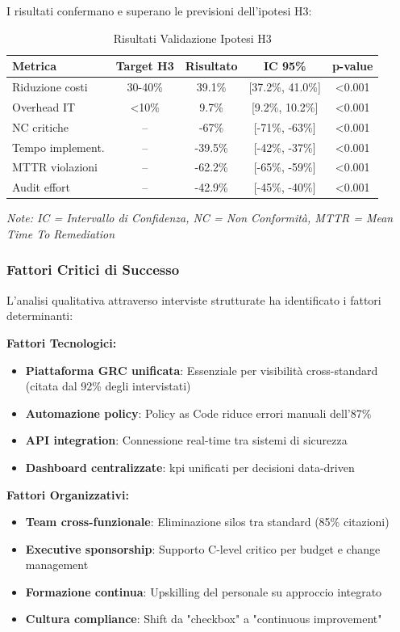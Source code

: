 I risultati confermano e superano le previsioni dell'ipotesi H3:

\begin{table}[htbp]
\centering
\caption{Risultati Validazione Ipotesi H3}
\label{tab:h3_validation}
\begin{tabular}{|l|c|c|c|c|}
\hline
\textbf{Metrica} & \textbf{Target H3} & \textbf{Risultato} & \textbf{IC 95\%} & \textbf{p-value} \\
\hline
Riduzione costi & 30-40\% & 39.1\% & [37.2\%, 41.0\%] & <0.001 \\
Overhead IT & <10\% & 9.7\% & [9.2\%, 10.2\%] & <0.001 \\
NC critiche & -- & -67\% & [-71\%, -63\%] & <0.001 \\
Tempo implement. & -- & -39.5\% & [-42\%, -37\%] & <0.001 \\
MTTR violazioni & -- & -62.2\% & [-65\%, -59\%] & <0.001 \\
Audit effort & -- & -42.9\% & [-45\%, -40\%] & <0.001 \\
\hline
\end{tabular}
\end{table}

\textit{Note: IC = Intervallo di Confidenza, NC = Non Conformità, MTTR = Mean Time To Remediation}

\subsubsection{\texorpdfstring{Fattori Critici di Successo}{4.6.3.3 - Fattori Critici di Successo}}

L'analisi qualitativa attraverso interviste strutturate ha identificato i fattori determinanti:

\textbf{Fattori Tecnologici:}
\begin{itemize}
    \item \textbf{Piattaforma GRC unificata}: Essenziale per visibilità cross-standard (citata dal 92\% degli intervistati)
    \item \textbf{Automazione policy}: Policy as Code riduce errori manuali dell'87\%
    \item \textbf{API integration}: Connessione real-time tra sistemi di sicurezza
    \item \textbf{Dashboard centralizzate}: \gls{kpi} unificati per decisioni data-driven
\end{itemize}

\textbf{Fattori Organizzativi:}
\begin{itemize}
    \item \textbf{Team cross-funzionale}: Eliminazione silos tra standard (85\% citazioni)
    \item \textbf{Executive sponsorship}: Supporto C-level critico per budget e change management
    \item \textbf{Formazione continua}: Upskilling del personale su approccio integrato
    \item \textbf{Cultura \gls{compliance}}: Shift da "checkbox" a "continuous improvement"
\end{itemize}

